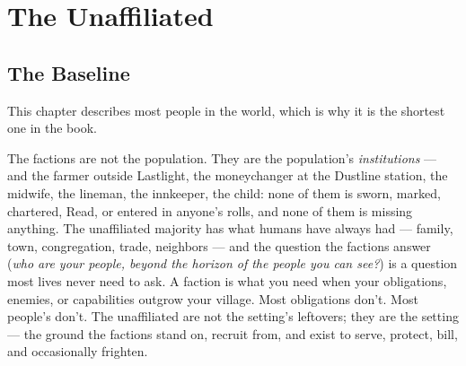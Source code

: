 
\section{The Unaffiliated}

\subsection{The Baseline}

This chapter describes most people in the world, which is why it is the shortest one in the book.

The factions are not the population. They are the population's \textit{institutions} --- and the farmer outside Lastlight, the moneychanger at the Dustline station, the midwife, the lineman, the innkeeper, the child: none of them is sworn, marked, chartered, Read, or entered in anyone's rolls, and none of them is missing anything. The unaffiliated majority has what humans have always had --- family, town, congregation, trade, neighbors --- and the question the factions answer (\textit{who are your people, beyond the horizon of the people you can see?}) is a question most lives never need to ask. A faction is what you need when your obligations, enemies, or capabilities outgrow your village. Most obligations don't. Most people's don't. The unaffiliated are not the setting's leftovers; they are the setting --- the ground the factions stand on, recruit from, and exist to serve, protect, bill, and occasionally frighten.

